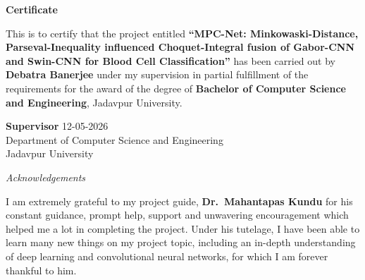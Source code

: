 \documentclass[12pt,a4paper]{article}
\begin{document}
\thispagestyle{plain}

\vspace*{0.5in}

{\Huge\bfseries Certificate}

\vspace{1.2cm}

\noindent
This is to certify that the project entitled \textbf{``MPC-Net: Minkowaski-Distance, Parseval-Inequality
influenced Choquet-Integral fusion of Gabor-CNN and
Swin-CNN for Blood Cell Classification''} has
been carried out by \textbf{Debatra Banerjee} under my supervision in partial
fulfillment of the requirements for the award of the degree of
\textbf{Bachelor of Computer Science and Engineering}, Jadavpur University.

\vspace{2.5cm}

\noindent
\rule{0pt}{1.2em}

\noindent
\textbf{Supervisor} \hspace{2cm} 12-05-2026\\

Department of Computer Science and Engineering\\
Jadavpur University

\newpage

\thispagestyle{plain}

\begin{center}
    {\Huge\itshape Acknowledgements}
\end{center}

\vspace{1cm}

\noindent
I am extremely grateful to my project guide, \textbf{Dr.\ Mahantapas Kundu}
for his constant guidance, prompt help, support and unwavering encouragement
which helped me a lot in completing the project. Under his tutelage, I have
been able to learn many new things on my project topic, including an in-depth
understanding of deep learning and convolutional neural networks, for which
I am forever thankful to him.
\end{document}
